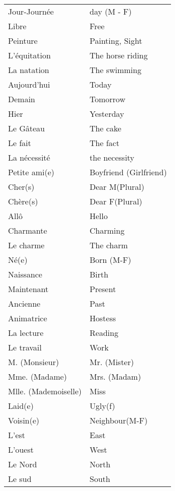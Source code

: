 \begin{longtable}{l  l}
Jour-Journ\'ee & day (M - F) \\
Libre & Free \\
Peinture & Painting, Sight \\
L'\'equitation & The horse riding \\
La natation & The swimming \\
Aujourd'hui & Today \\
Demain & Tomorrow \\
Hier & Yesterday \\
Le G\^ateau & The cake \\
Le fait & The fact \\
La n\'ecessit\'e & the necessity \\
Petite ami(e) & Boyfriend (Girlfriend) \\
Cher(s) & Dear M(Plural) \\
Ch\`ere(s) & Dear F(Plural) \\
All\^o & Hello \\
Charmante & Charming \\
Le charme & The charm \\
N\'e(e) & Born (M-F) \\
Naissance & Birth \\
Maintenant & Present \\
Ancienne & Past \\
Animatrice & Hostess \\
La lecture & Reading \\
Le travail & Work \\
M. (Monsieur) & Mr. (Mister) \\
Mme. (Madame) & Mrs. (Madam) \\
Mlle. (Mademoiselle) & Miss \\
Laid(e) & Ugly(f) \\
Voisin(e) & Neighbour(M-F)\\
L'est & East \\
L'ouest & West \\
Le Nord & North \\
Le sud & South \\
\end{longtable}
